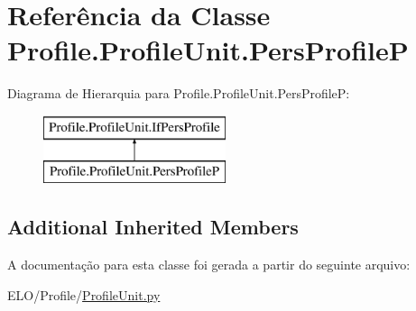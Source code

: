 \hypertarget{classProfile_1_1ProfileUnit_1_1PersProfileP}{\section{Referência da Classe Profile.\-Profile\-Unit.\-Pers\-Profile\-P}
\label{classProfile_1_1ProfileUnit_1_1PersProfileP}
}
Diagrama de Hierarquia para Profile.\-Profile\-Unit.\-Pers\-Profile\-P\-:\begin{figure}[H]
\begin{center}
\leavevmode
\includegraphics[height=2.000000cm]{d9/da2/classProfile_1_1ProfileUnit_1_1PersProfileP}
\end{center}
\end{figure}
\subsection*{Additional Inherited Members}


A documentação para esta classe foi gerada a partir do seguinte arquivo\-:\begin{DoxyCompactItemize}
\item 
E\-L\-O/\-Profile/\hyperlink{ProfileUnit_8py}{Profile\-Unit.\-py}\end{DoxyCompactItemize}
